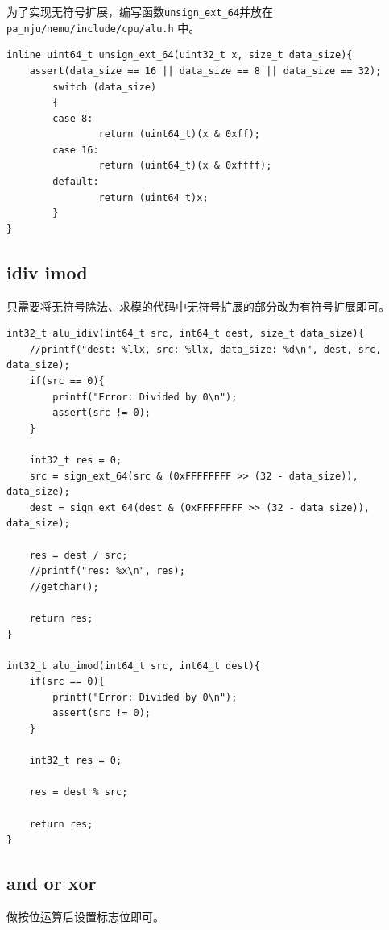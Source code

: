 \documentclass[UTF8]{ctexart}
\begin{document}
为了实现无符号扩展，编写函数\verb|unsign_ext_64|并放在\verb|pa_nju/nemu/include/cpu/alu.h| 中。

\begin{lstlisting}[style=CStyle]
inline uint64_t unsign_ext_64(uint32_t x, size_t data_size){
    assert(data_size == 16 || data_size == 8 || data_size == 32);
        switch (data_size)
        {
        case 8:
                return (uint64_t)(x & 0xff);
        case 16:
                return (uint64_t)(x & 0xffff);
        default:
                return (uint64_t)x;
        }
}
\end{lstlisting}

\subsection{idiv imod}
只需要将无符号除法、求模的代码中无符号扩展的部分改为有符号扩展即可。

\begin{lstlisting}[style=CStyle]
int32_t alu_idiv(int64_t src, int64_t dest, size_t data_size){
    //printf("dest: %llx, src: %llx, data_size: %d\n", dest, src, data_size);
    if(src == 0){
        printf("Error: Divided by 0\n");
        assert(src != 0);
    }
    
    int32_t res = 0;
    src = sign_ext_64(src & (0xFFFFFFFF >> (32 - data_size)), data_size);
    dest = sign_ext_64(dest & (0xFFFFFFFF >> (32 - data_size)), data_size);
    
    res = dest / src;
    //printf("res: %x\n", res);
    //getchar();
    
    return res;
}

int32_t alu_imod(int64_t src, int64_t dest){
    if(src == 0){
        printf("Error: Divided by 0\n");
        assert(src != 0);
    }
    
    int32_t res = 0;
    
    res = dest % src;
    
    return res;
}

\end{lstlisting}

\subsection{and or xor}
做按位运算后设置标志位即可。
\end{document}
